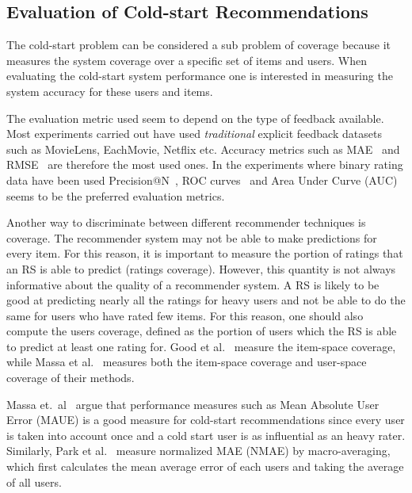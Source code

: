 \subsection{Evaluation of Cold-start Recommendations}
\label{sec:cold-start-eval}
The cold-start problem can be considered a sub problem of coverage because it
measures the system coverage over a specific set of items and users. When
evaluating the cold-start system performance one is interested in measuring the
system accuracy for these users and items.

The evaluation metric used seem to depend on the type of feedback available.
Most experiments carried out have used \emph{traditional} explicit feedback datasets such as
MovieLens, EachMovie, Netflix etc. Accuracy metrics such as MAE~\cite{Rashid2002, Rashid2008, Massa2004,
Massa2007, Stern2009} and RMSE~\cite{Agarwal2009, Agarwal2010} are therefore
the most used ones. In the experiments where binary rating data have been used
Precision@N~\cite{Liu2011, Gantner2010}, ROC curves~\cite{Agarwal2009,
Gantner2010, Schein2002} and Area Under Curve (AUC) \cite{Liu2011, Gantner2010} seems to be the
preferred evaluation metrics.

Another way to discriminate between different recommender techniques is
coverage. The recommender system may not be able to make predictions for every
item. For this reason, it is important to measure the portion of ratings that
an RS is able to predict (ratings coverage). However, this quantity is not
always informative about the quality of a recommender system. A RS is likely to
be good at predicting nearly all the ratings for heavy users and not be able to
do the same for users who have rated few items. For this reason, one should
also compute the users coverage, defined as the portion of users which the RS
is able to predict at least one rating for. Good et al.~\cite{Good1999}
measure the item-space coverage, while Massa et al.~\cite{Massa2004,
Massa2007} measures both the item-space coverage and user-space coverage of
their methods.

Massa et.\ al~\cite{Massa2004} argue that performance measures such as Mean
Absolute User Error (MAUE) is a good measure for cold-start recommendations
since every user is taken into account once and a cold start user is as
influential as an heavy rater. Similarly, Park et al.~\cite{Park2006} measure
normalized MAE (NMAE) by macro-averaging, which first calculates the mean
average error of each users and taking the average of all users.

